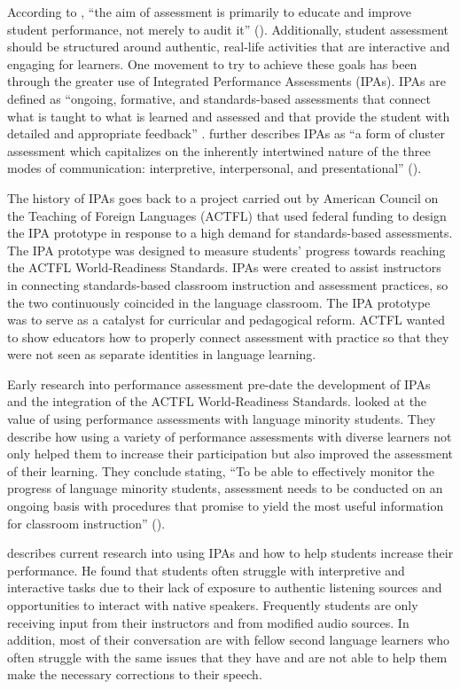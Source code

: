 \documentclass[output=paper]{langscibook}
\begin{document}
  According to \citet{Wiggins1998}, “the aim of assessment is primarily to educate and improve student performance, not merely to audit it” (\citeyear[7]{Wiggins1998}). Additionally, student assessment should be structured around authentic, real-life activities that are interactive and engaging for learners. One movement to try to achieve these goals has been through the greater use of Integrated Performance Assessments (IPAs). IPAs are defined as “ongoing, formative, and standards-based assessments that connect what is taught to what is learned and assessed and that provide the student with detailed and appropriate feedback” \citep{Adair-HauckTroyan2013}. \citet{DiazMaggioli2020} further describes IPAs as “a form of cluster assessment which capitalizes on the inherently intertwined nature of the three modes of communication: interpretive, interpersonal, and presentational” (\citeyear[24]{DiazMaggioli2020}).

The history of IPAs goes back to a project carried out by American Council on the Teaching of Foreign Languages (ACTFL) that used federal funding to design the IPA prototype in response to a high demand for standards-based assessments. The IPA prototype was designed to measure students’ progress towards reaching the ACTFL World-Readiness Standards. IPAs were created to assist instructors in connecting standards-based classroom instruction and assessment practices, so the two continuously coincided in the language classroom. The IPA prototype was to serve as a catalyst for curricular and pedagogical reform. ACTFL wanted to show educators how to properly connect assessment with practice so that they were not seen as separate identities in language learning.

Early research into performance assessment pre-date the development of IPAs and the integration of the ACTFL World-Readiness Standards. \citet{PierceOMalley1992} looked at the value of using performance assessments with language minority students. They describe how using a variety of performance assessments with diverse learners not only helped them to increase their participation but also improved the assessment of their learning. They conclude stating, “To be able to effectively monitor the progress of language minority students, assessment needs to be conducted on an ongoing basis with procedures that promise to yield the most useful information for classroom instruction” (\citeyear[27]{PierceOMalley1992}).

\citet{DiazMaggioli2020} describes current research into using IPAs and how to help students increase their performance. He found that students often struggle with interpretive and interactive tasks due to their lack of exposure to authentic listening sources and opportunities to interact with native speakers. Frequently students are only receiving input from their instructors and from modified audio sources. In addition, most of their conversation are with fellow second language learners who often struggle with the same issues that they have and are not able to help them make the necessary corrections to their speech.
\end{document}
